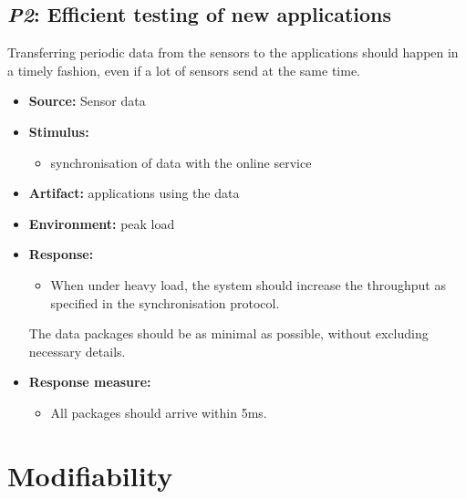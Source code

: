 \subsection{\emph{P2}: Efficient testing of new applications}
Transferring periodic data from the sensors to the applications should happen in a timely fashion, even if a lot of sensors send at the same time.

\begin{itemize}
    \item \textbf{Source:} Sensor data
    \item \textbf{Stimulus:}
        \begin{itemize}
            \item synchronisation of data with the online service
        \end{itemize}

    \item \textbf{Artifact:} applications using the data
    \item \textbf{Environment:} peak load
    \item \textbf{Response:}
        \begin{itemize}
            \item When under heavy load, the system should increase the throughput as specified in the synchronisation protocol.
        \end{itemize} The data packages should be as minimal as possible, without excluding necessary details.
    \item \textbf{Response measure:}
        \begin{itemize}
            \item All packages should arrive within 5ms.
        \end{itemize}
\end{itemize}

\section{Modifiability}
